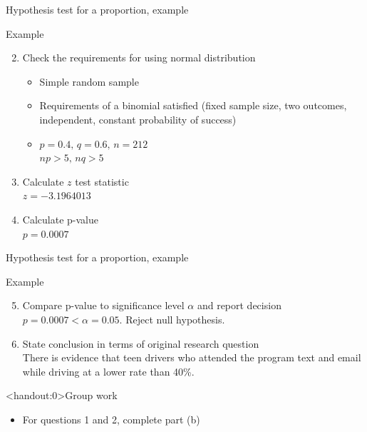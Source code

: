 \documentclass[xcolor=table]{beamer}
\begin{document}
\begin{frame}{Hypothesis test for a proportion, example}
\begin{exampleblock}{Example}
\large
\begin{enumerate}
\setcounter{enumi}{1}
\item Check the requirements for using normal distribution
\pause\begin{itemize}
\item Simple random sample
\item Requirements of a binomial satisfied (fixed sample size, two outcomes, independent, constant probability of success)
\item $p=0.4, \, q=0.6, \, n=212$\\
$np > 5, \, nq >5$
\end{itemize}
\pause\item Calculate $z$ test statistic\\
\pause$z = -3.1964013$
\pause\item Calculate p-value\\
\pause$p = 0.0007$
\end{enumerate}
\end{exampleblock}
\end{frame}

\begin{frame}{Hypothesis test for a proportion, example}
\begin{exampleblock}{Example}
\large
\begin{enumerate}
\setcounter{enumi}{4}
\item Compare p-value to significance level $\alpha$ and report decision\\
\pause$p = 0.0007 < \alpha =0.05$. Reject null hypothesis.

\pause\item State conclusion in terms of original research question\\
\pause There is evidence that teen drivers who attended the program text and email while driving at a lower rate than 40\%.
\end{enumerate}

\end{exampleblock}
\end{frame}

\begin{frame}<handout:0>{Group work}
\begin{block}{}
\large
\begin{itemize}
\item For questions 1 and 2, complete part (b)
\end{itemize}
\end{block}
\end{frame}
\end{document}

